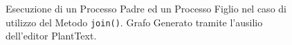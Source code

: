 \begin{figure}[H]
    \centering
    
    \caption{Esecuzione di un Processo Padre ed un Processo Figlio nel caso di utilizzo del Metodo \texttt{join()}. Grafo Generato tramite l'ausilio dell'editor PlantText\cite{PlantText}.}
    \label{fig.ThreadJoinExecutionFlow}
\end{figure}